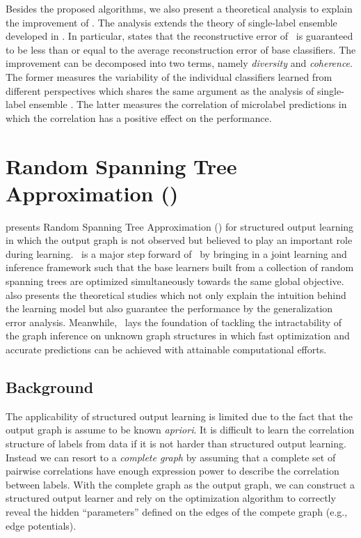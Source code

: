 {Besides the proposed algorithms, we also present a theoretical analysis to explain the improvement of \mam.
The analysis extends the theory of single-label ensemble developed in \citep{Brown10good}.
In particular,  states that the reconstructive error of \mam\ is guaranteed to be less than or equal to the average reconstruction error of base classifiers.
The improvement can be decomposed into two terms, namely \textit{diversity} and \textit{coherence}.
The former measures the variability of the individual classifiers learned from different perspectives which shares the same argument as the analysis of single-label ensemble \citep{Brown10good}.
The latter measures the correlation of microlabel predictions in which the correlation has a positive effect on the performance. 


%
%
\section{Random Spanning Tree Approximation (\rta)}\label{sc_su14c}

 presents Random Spanning Tree Approximation (\rta) for structured output learning in which the output graph is not observed but believed to play an important role during learning.
\rta\ is a major step forward of \mam\ by bringing in a joint learning and inference framework such that the base learners built from a collection of random spanning trees are optimized simultaneously towards the same global objective.
 also presents the theoretical studies which not only explain the intuition behind the learning model but also guarantee the performance by the generalization error analysis.
Meanwhile, \rta\ lays the foundation of tackling the intractability of the graph inference on unknown graph structures in which fast optimization and accurate predictions can be achieved with attainable computational efforts.



%
%
\subsection{Background}

The applicability of structured output learning is limited due to the fact that the output graph is assume to be known \textit{apriori}.
It is difficult to learn the correlation structure of labels from data \citep{Chickering94learning} if it is not harder than structured output learning.
Instead we can resort to a \textit{complete graph} by assuming that a complete set of pairwise correlations have enough expression power to describe the correlation between labels.
With the complete graph as the output graph, we can construct a structured output learner and rely on the optimization algorithm to correctly reveal the hidden ``parameters'' defined on the edges of the compete graph (e.g., edge potentials).

}
